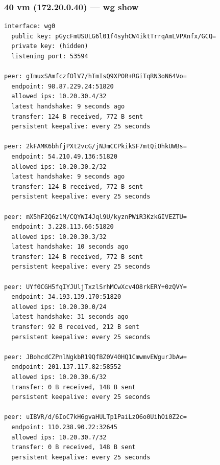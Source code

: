 \documentclass[11pt,a4paper]{article}
\begin{document}
\subsubsection*{40 vm (172.20.0.40) — wg show}
\begin{lstlisting}
interface: wg0
  public key: pGycFmUSULG6l01f4syhCW4iktTrrqAmLVPXnfx/GCQ=
  private key: (hidden)
  listening port: 53594

peer: gImuxSAmfczfOlV7/hTmIsQ9XPOR+RGiTqRN3oN64Vo=
  endpoint: 98.87.229.24:51820
  allowed ips: 10.20.30.4/32
  latest handshake: 9 seconds ago
  transfer: 124 B received, 772 B sent
  persistent keepalive: every 25 seconds

peer: 2kFAMK6bhfjPXt2vcG/jNJmCCPkikSF7mtQiOhkUWBs=
  endpoint: 54.210.49.136:51820
  allowed ips: 10.20.30.2/32
  latest handshake: 9 seconds ago
  transfer: 124 B received, 772 B sent
  persistent keepalive: every 25 seconds

peer: mX5hF2Q6z1M/CQYWI4Jql9U/kyznPWiR3KzkGIVEZTU=
  endpoint: 3.228.113.66:51820
  allowed ips: 10.20.30.3/32
  latest handshake: 10 seconds ago
  transfer: 124 B received, 772 B sent
  persistent keepalive: every 25 seconds

peer: UYf0CGH5fqIYJUljTxzlSrhMCwXcv4O8rkERY+0zQVY=
  endpoint: 34.193.139.170:51820
  allowed ips: 10.20.30.0/24
  latest handshake: 31 seconds ago
  transfer: 92 B received, 212 B sent
  persistent keepalive: every 25 seconds

peer: JBohcdCZPnlNgkbR19QfBZ0V40HQ1CmwmvEWgurJbAw=
  endpoint: 201.137.117.82:58552
  allowed ips: 10.20.30.6/32
  transfer: 0 B received, 148 B sent
  persistent keepalive: every 25 seconds

peer: uIBVR/d/6IoC7kH6gvaHULTp1PaiLzO6o0UihOi0Z2c=
  endpoint: 110.238.90.22:32645
  allowed ips: 10.20.30.7/32
  transfer: 0 B received, 148 B sent
  persistent keepalive: every 25 seconds

\end{lstlisting}
\end{document}
